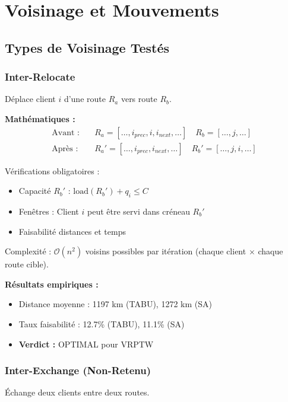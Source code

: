 \documentclass[12pt,a4paper,twoside]{report}
\begin{document}
\section{Voisinage et Mouvements}

\subsection{Types de Voisinage Testés}

\subsubsection{Inter-Relocate}

Déplace client $i$ d'une route $R_a$ vers route $R_b$.

\textbf{Mathématiques :}
\begin{align}
    \text{Avant :} & \quad R_a = [\ldots, i_{prec}, i, i_{next}, \ldots] \quad R_b = [\ldots, j, \ldots]   \\
    \text{Après :} & \quad R_a' = [\ldots, i_{prec}, i_{next}, \ldots] \quad R_b' = [\ldots, j, i, \ldots]
\end{align}

Vérifications obligatoires :
\begin{itemize}
    \item Capacité $R_b'$ : $\text{load}(R_b') + q_i \leq C$
    \item Fenêtres : Client $i$ peut être servi dans créneau $R_b'$
    \item Faisabilité distances et temps
\end{itemize}

Complexité : $\mathcal{O}(n^2)$ voisins possibles par itération (chaque client
$\times$ chaque route cible).

\textbf{Résultats empiriques :}
\begin{itemize}
    \item Distance moyenne : 1197 km (TABU), 1272 km (SA)
    \item Taux faisabilité : 12.7\% (TABU), 11.1\% (SA)
    \item \textbf{Verdict :} OPTIMAL pour VRPTW
\end{itemize}

\subsubsection{Inter-Exchange (Non-Retenu)}

Échange deux clients entre deux routes.
\end{document}
